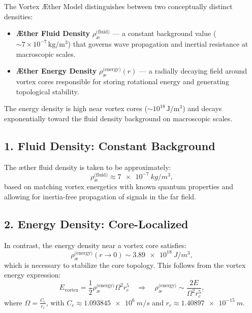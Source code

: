 The Vortex Æther Model distinguishes between two conceptually distinct densities:

\begin{itemize}
    \item \textbf{Æther Fluid Density} \(\rho_{\text{\ae}}^{\text{(fluid)}}\) — a constant background value (\(\sim 7 \times 10^{-7}\, \mathrm{kg/m^3}\)) that governs wave propagation and inertial resistance at macroscopic scales.
    \item \textbf{Æther Energy Density} \(\rho_{\text{\ae}}^{\text{(energy)}}(r)\) — a radially decaying field around vortex cores responsible for storing rotational energy and generating topological stability.
\end{itemize}

The energy density is high near vortex cores (\(\sim 10^{18}\, \mathrm{J/m^3}\)) and decays exponentially toward the fluid density background on
macroscopic scales.


\subsection*{1. Fluid Density: Constant Background}

The æther fluid density is taken to be approximately:
\begin{equation}
    \rho_{\text{\ae}}^{\text{(fluid)}} \approx \SI{7e-7}{kg/m^3},
\end{equation}
based on matching vortex energetics with known quantum properties and allowing for inertia-free propagation of signals in the far field.

\subsection*{2. Energy Density: Core-Localized}

In contrast, the energy density near a vortex core satisfies:
\begin{equation}
    \rho_{\text{\ae}}^{\text{(energy)}}(r \to 0) \sim \SI{3.89e18}{J/m^3},
\end{equation}
which is necessary to stabilize the core topology. This follows from the vortex energy expression:
\begin{equation}
    E_{\text{vortex}} = \frac{1}{2} \rho_{\text{\ae}}^{\text{(energy)}} \Omega^2 r_c^5
    \quad\Rightarrow\quad
    \rho_{\text{\ae}}^{\text{(energy)}} \sim \frac{2E}{\Omega^2 r_c^5},
\end{equation}
where \( \Omega = \frac{C_e}{r_c} \), with \( C_e \approx \SI{1.093845e6}{m/s} \) and \( r_c \approx \SI{1.40897e-15}{m} \).

